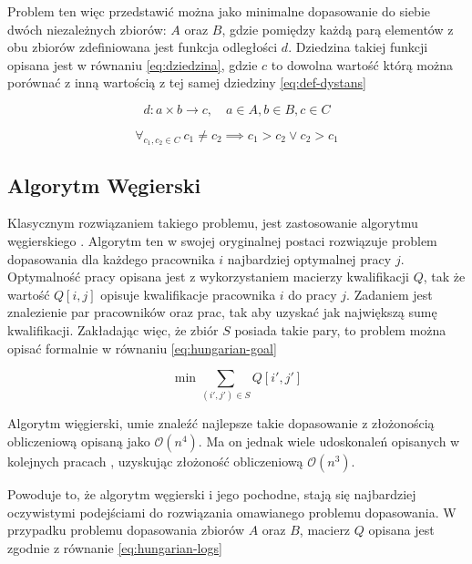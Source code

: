 Problem ten więc przedstawić można jako minimalne dopasowanie do siebie dwóch
niezależnych zbiorów: $A$ oraz $B$, gdzie pomiędzy każdą parą elementów z obu
zbiorów zdefiniowana jest funkcja odległości $d$. Dziedzina takiej funkcji
opisana jest w równaniu \ref{eq:dziedzina}, gdzie $c$ to dowolna wartość którą
można porównać z inną wartością z tej samej dziedziny \ref{eq:def-dystans}

\begin{equation}
  d: a \times b \rightarrow c, \quad a \in A, b \in B, c \in C \label{eq:dziedzina}
\end{equation}

\begin{equation}
  \forall_{c_1,c_2 \in C}\ c_1 \neq c_2 \implies c_1 > c_2 \lor c_2 > c_1 \label{eq:def-dystans}
\end{equation}

\todo{}

\subsection{Algorytm Węgierski}

Klasycznym rozwiązaniem takiego problemu, jest zastosowanie algorytmu
węgierskiego \cite{Hungarian}.
Algorytm ten w swojej oryginalnej postaci rozwiązuje problem dopasowania dla
każdego pracownika $i$ najbardziej optymalnej pracy $j$.
Optymalność pracy opisana jest z wykorzystaniem macierzy kwalifikacji $Q$, tak
że wartość $Q[i, j]$ opisuje kwalifikacje pracownika $i$ do pracy $j$.
Zadaniem jest znalezienie par pracowników oraz prac, tak aby uzyskać jak
największą sumę kwalifikacji.
Zakładając więc, że zbiór $S$ posiada takie pary, to problem można opisać
formalnie w równaniu \ref{eq:hungarian-goal}

\begin{equation}
  \min \sum_{(i', j') \in S} Q[i', j']\label{eq:hungarian-goal}
\end{equation}

Algorytm więgierski, umie znaleźć najlepsze takie dopasowanie z złożonością
obliczeniową opisaną jako $\mathcal{O}(n^4)$.
Ma on jednak wiele udoskonaleń opisanych w kolejnych pracach
\cite{Hungarian-o3-1}\cite{Hungarian-o3-2}, uzyskując złożoność obliczeniową
$\mathcal{O}(n^3)$.

Powoduje to, że algorytm węgierski i jego pochodne, stają się najbardziej
oczywistymi podejściami do rozwiązania omawianego problemu dopasowania.
W przypadku problemu dopasowania zbiorów $A$ oraz $B$, macierz $Q$ opisana jest
zgodnie z równanie \ref{eq:hungarian-logs}

